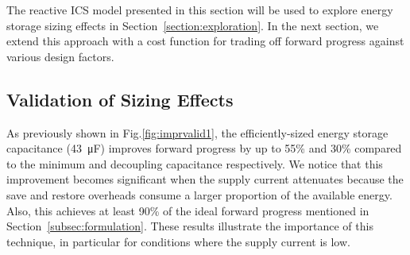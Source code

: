 




The reactive ICS model presented in this section will be used to explore energy storage sizing effects in Section~\ref{section:exploration}. In the next section, we extend this approach with a cost function for trading off forward progress against various design factors. 


\subsection{Validation of Sizing Effects}

As previously shown in Fig.\ref{fig:imprvalid1}, the efficiently-sized energy storage capacitance (\SI{43}{\micro\farad}) improves forward progress by up to 55\% and 30\% compared to the minimum and decoupling capacitance respectively. We notice that this improvement becomes significant when the supply current attenuates because the save and restore overheads consume a larger proportion of the available energy. Also, this achieves at least 90\% of the ideal forward progress mentioned in Section~\ref{subsec:formulation}. 
These results illustrate the importance of this technique, in particular for conditions where the supply current is low.